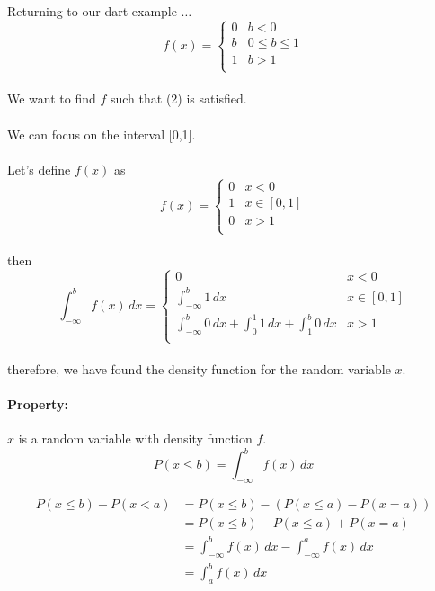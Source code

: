 \documentclass{article}
\begin{document}
\paragraph{} Returning to our dart example $\ldots$
\[ f(x) = \begin{cases}
    0 & b < 0 \\
    b & 0 \le b \le 1 \\
    1 & b > 1 \\
    \end{cases}
\]
\paragraph{}We want to find $f$ such that (2) is satisfied.
\paragraph{}We can focus on the interval [0,1].
\paragraph{}Let's define $f(x)$ as
\[ f(x) = \begin{cases}
    0 & x < 0 \\
    1 & x \in [0,1] \\
    0 & x > 1  \\
    \end{cases}
\]
\paragraph{} then
\[ \int_{-\infty}^{b}f(x) \,dx = \begin{cases}
    0 & x < 0 \\
    \int_{-\infty}^{b} 1 \,dx  & x \in [0,1] \\
    \int_{-\infty}^b 0 \,dx + \int_0^1 1 \,dx + \int_1^b 0 \,dx& x > 1 \\
    \end{cases}
\]
\paragraph{}therefore, we have found the density function for the random variable $x$.
\paragraph{Property:} $x$ is a random variable with density function $f$. 
\begin{equation}
    P(x \le b) = \int_{-\infty}^b f(x)\,dx
\end{equation}

\begin{align*}
    P(x\le b) - P(x < a) &= P(x \le b) - (P(x \le a)- P (x = a))\\
                         &= P(x \le b) - P(x \le a) + P(x = a)\\
                         &= \int_{-\infty}^b f(x) \,dx - \int_{-\infty}^a f(x)\,dx\\
                         &= \int_{a}^b f(x)\,dx
\end{align*}
\end{document}
